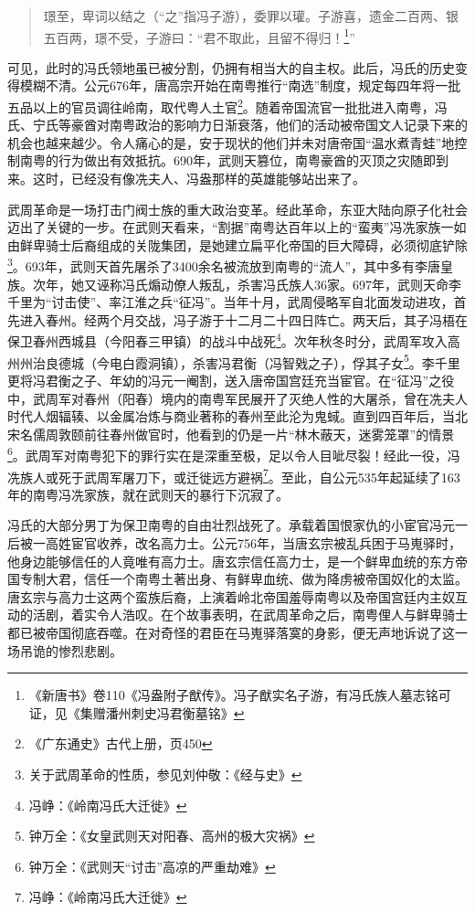 \begin{quote}
	璟至，卑词以结之（“之”指冯子游），委罪以瓘。子游喜，遗金二百两、银五百两，璟不受，子游曰：“君不取此，且留不得归！\footnote{《新唐书》卷110《冯盎附子猷传》。冯子猷实名子游，有冯氏族人墓志铭可证，见《集赠潘州刺史冯君衡墓铭》}”
\end{quote}

可见，此时的冯氏领地虽已被分割，仍拥有相当大的自主权。此后，冯氏的历史变得模糊不清。公元676年，唐高宗开始在南粤推行“南选”制度，规定每四年将一批五品以上的官员调往岭南，取代粤人土官\footnote{《广东通史》古代上册，页450}。随着帝国流官一批批进入南粤，冯氏、宁氏等豪酋对南粤政治的影响力日渐衰落，他们的活动被帝国文人记录下来的机会也越来越少。令人痛心的是，安于现状的他们并未对唐帝国“温水煮青蛙”地控制南粤的行为做出有效抵抗。690年，武则天篡位，南粤豪酋的灭顶之灾随即到来。这时，已经没有像冼夫人、冯盎那样的英雄能够站出来了。

武周革命是一场打击门阀士族的重大政治变革。经此革命，东亚大陆向原子化社会迈出了关键的一步。在武则天看来，“割据”南粤达百年以上的“蛮夷”冯冼家族一如由鲜卑骑士后裔组成的关陇集团，是她建立扁平化帝国的巨大障碍，必须彻底铲除\footnote{关于武周革命的性质，参见刘仲敬：《经与史》}。693年，武则天首先屠杀了3400余名被流放到南粤的“流人”，其中多有李唐皇族。次年，她又诬称冯氏煽动僚人叛乱，杀害冯氏族人36家。697年，武则天命李千里为“讨击使”、率江淮之兵“征冯”。当年十月，武周侵略军自北面发动进攻，首先进入春州。经两个月交战，冯子游于十二月二十四日阵亡。两天后，其子冯梧在保卫春州西城县（今阳春三甲镇）的战斗中战死\footnote{冯峥：《岭南冯氏大迁徙》}。次年秋冬时分，武周军攻入高州州治良德城（今电白霞洞镇），杀害冯君衡（冯智戣之子），俘其子女\footnote{钟万全：《女皇武则天对阳春、高州的极大灾祸》}。李千里更将冯君衡之子、年幼的冯元一阉割，送入唐帝国宫廷充当宦官。在“征冯”之役中，武周军对春州（阳春）境内的南粤军民展开了灭绝人性的大屠杀，曾在冼夫人时代人烟辐辏、以金属冶炼与商业著称的春州至此沦为鬼蜮。直到四百年后，当北宋名儒周敦颐前往春州做官时，他看到的仍是一片“林木蔽天，迷雾笼罩”的情景\footnote{钟万全：《武则天“讨击”高凉的严重劫难》}。武周军对南粤犯下的罪行实在是深重至极，足以令人目呲尽裂！经此一役，冯冼族人或死于武周军屠刀下，或迁徙远方避祸\footnote{冯峥：《岭南冯氏大迁徙》}。至此，自公元535年起延续了163年的南粤冯冼家族，就在武则天的暴行下沉寂了。

冯氏的大部分男丁为保卫南粤的自由壮烈战死了。承载着国恨家仇的小宦官冯元一后被一高姓宦官收养，改名高力士。公元756年，当唐玄宗被乱兵困于马嵬驿时，他身边能够信任的人竟唯有高力士。唐玄宗信任高力士，是一个鲜卑血统的东方帝国专制大君，信任一个南粤土著出身、有鲜卑血统、做为降虏被帝国奴化的太监。唐玄宗与高力士这两个蛮族后裔，上演着岭北帝国羞辱南粤以及帝国宫廷内主奴互动的活剧，着实令人浩叹。在个故事表明，在武周革命之后，南粤俚人与鲜卑骑士都已被帝国彻底吞噬。在对奇怪的君臣在马嵬驿落寞的身影，便无声地诉说了这一场吊诡的惨烈悲剧。




